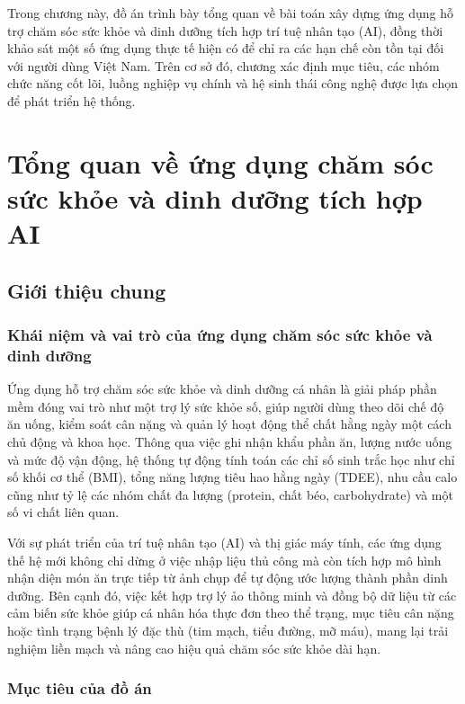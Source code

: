 \documentclass[../main.tex]{subfiles}
\begin{document}
Trong chương này, đồ án trình bày tổng quan về bài toán xây dựng ứng dụng hỗ trợ chăm sóc sức khỏe và dinh dưỡng tích hợp trí tuệ nhân tạo (AI), đồng thời khảo sát một số ứng dụng thực tế hiện có để chỉ ra các hạn chế còn tồn tại đối với người dùng Việt Nam. Trên cơ sở đó, chương xác định mục tiêu, các nhóm chức năng cốt lõi, luồng nghiệp vụ chính và hệ sinh thái công nghệ được lựa chọn để phát triển hệ thống.

\section{Tổng quan về ứng dụng chăm sóc sức khỏe và dinh dưỡng tích hợp AI}
\label{sec:1.1}

\subsection{Giới thiệu chung}
\label{sec:1.1.1}

\subsubsection{Khái niệm và vai trò của ứng dụng chăm sóc sức khỏe và dinh dưỡng}

Ứng dụng hỗ trợ chăm sóc sức khỏe và dinh dưỡng cá nhân là giải pháp phần mềm đóng vai trò như một trợ lý sức khỏe số, giúp người dùng theo dõi chế độ ăn uống, kiểm soát cân nặng và quản lý hoạt động thể chất hằng ngày một cách chủ động và khoa học. Thông qua việc ghi nhận khẩu phần ăn, lượng nước uống và mức độ vận động, hệ thống tự động tính toán các chỉ số sinh trắc học như chỉ số khối cơ thể (BMI), tổng năng lượng tiêu hao hằng ngày (TDEE), nhu cầu calo cũng như tỷ lệ các nhóm chất đa lượng (protein, chất béo, carbohydrate) và một số vi chất liên quan.

Với sự phát triển của trí tuệ nhân tạo (AI) và thị giác máy tính, các ứng dụng thế hệ mới không chỉ dừng ở việc nhập liệu thủ công mà còn tích hợp mô hình nhận diện món ăn trực tiếp từ ảnh chụp để tự động ước lượng thành phần dinh dưỡng. Bên cạnh đó, việc kết hợp trợ lý ảo thông minh và đồng bộ dữ liệu từ các cảm biến sức khỏe giúp cá nhân hóa thực đơn theo thể trạng, mục tiêu cân nặng hoặc tình trạng bệnh lý đặc thù (tim mạch, tiểu đường, mỡ máu), mang lại trải nghiệm liền mạch và nâng cao hiệu quả chăm sóc sức khỏe dài hạn.

\subsubsection{Mục tiêu của đồ án}
\end{document}
